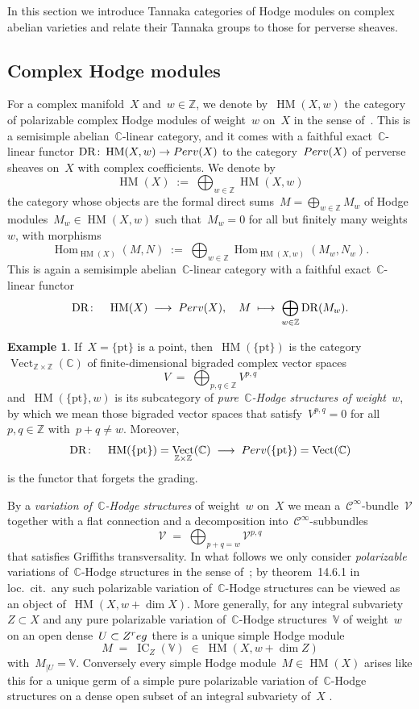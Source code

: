 \documentclass[a4paper]{amsart}
\newcommand{\bbC}{\mathbb{C}}
\newcommand{\bbV}{\mathbb{V}}
\newcommand{\bbZ}{\mathbb{Z}}
\newcommand{\cC}{\mathcal{C}}
\newcommand{\cV}{\mathcal{V}}
\newcommand{\reg}{\textup{reg}}
\newcommand{\too}{\longrightarrow}
\newcommand{\Perv}{\textup{Perv}}
\DeclareMathOperator{\Vect}{Vect}
\DeclareMathOperator{\Hom}{Hom}
\DeclareMathOperator{\IC}{IC}
\DeclareMathOperator{\DR}{DR}
\DeclareMathOperator{\HM}{HM}
\theoremstyle{plain}
\theoremstyle{definition}
\newtheorem{example}[theorem]{Example}
\numberwithin{equation}{section}
\begin{document}
In this section we introduce Tannaka categories of Hodge modules on complex abelian varieties and relate their Tannaka groups to those for perverse sheaves.

\subsection{Complex Hodge modules} For a complex manifold~$X$ and~$w\in \bbZ$, we denote by~$\HM(X, w)$ the category of polarizable complex Hodge modules of weight~$w$ on~$X$ in the sense of~\cite[def.~14.2.2]{MHMProject}. This is a semisimple abelian~$\bbC$-linear category, and it comes with a faithful exact~$\bbC$-linear functor
%
$
 \DR\colon \HM(X, w) \rightarrow \Perv(X)
$ 
%
to the category~$\Perv(X)$ of perverse sheaves on~$X$ with complex coefficients. We denote by
%
\[ \HM(X) \;:=\; \bigoplus_{w\in \bbZ} \HM(X, w) \]
%
the category whose objects are the formal direct sums~$M=\bigoplus_{w\in \bbZ} M_w$ of Hodge modules~$M_w \in \HM(X, w)$ such that~$M_w = 0$ for all but finitely many weights~$w$, with morphisms
%
\[
 \Hom_{\HM(X)}(M, N) \;:=\; \bigoplus_{w\in \bbZ} \Hom_{\HM(X, w)} (M_w, N_w). 
\] 
%
This is again a semisimple abelian~$\bbC$-linear category with a faithful exact~$\bbC$-linear functor
%
\[
 \DR\colon \quad \HM(X) \;\longrightarrow\; \Perv(X), \quad M \;\longmapsto\; \bigoplus_{w\in \bbZ} \DR(M_w).
\]

\begin{example} \label{hodge-modules-on-a-point}
If~$X=\{\mathrm{pt}\}$ is a point, then~$\HM(\{\mathrm{pt}\})$ is the category~$\Vect_{\bbZ \times \bbZ}(\bbC)$ of finite-dimensional bigraded complex vector spaces
%
\[
 V \;=\; \bigoplus_{p,q\in \bbZ} V^{p,q}
\]
%
and~$\HM(\{\mathrm{pt}\}, w)$ is its subcategory of \emph{pure~$\bbC$-Hodge structures of weight~$w$}, by which we mean those bigraded vector spaces that satisfy~$V^{p,q}=0$ for all~$p,q\in \bbZ$ with~$p+q\neq w$. Moreover, 
%
\[ \DR\colon \quad \HM(\{\mathrm{pt}\}) = \Vect_{\bbZ \times \bbZ}(\bbC) \; \too \; \Perv(\{\mathrm{pt}\})=\Vect(\bbC) \]
%
is the functor that forgets the grading. 
\end{example} 


By a \emph{variation of~$\bbC$-Hodge structures} of weight~$w$ on~$X$ we mean a~$\cC^\infty$-bundle~$\cV$ together with a flat connection and a decomposition into~$\cC^\infty$-subbundles
%
\[
 \cV \;=\; \bigoplus_{p+q=w} \cV^{p,q}
\]
%
that satisfies Griffiths transversality. In what follows we only consider \emph{polarizable} variations of~$\bbC$-Hodge structures in the sense of~\cite[def.~4.1.9]{MHMProject}; by theorem~14.6.1 in loc.~cit.~any such polarizable variation of~$\bbC$-Hodge structures can be viewed as an object of~$\HM(X, w + \dim X)$. More generally, for any integral subvariety~$Z\subset X$ and any pure polarizable variation of~$\bbC$-Hodge structures~$\bbV$ of weight~$w$ on an open dense~$U\subset Z^\reg$ there is a unique simple Hodge module 
%
\[
 M \;=\; \IC_Z(\bbV) \;\in\; \HM(X, w+\dim Z)
\]
%
with~$M_{\vert U} = \bbV$. Conversely every simple Hodge module~$M\in \HM(X)$ arises like this for a unique germ of a simple pure polarizable variation of~$\bbC$-Hodge structures on a dense open subset of an integral subvariety of~$X$ \cite[th.~16.2.1]{MHMProject}. 
\end{document}
